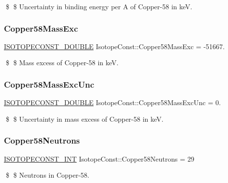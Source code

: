 \$ \$ Uncertainty in binding energy per A of Copper-\/58 in keV. \mbox{\label{group___isotope_const-_copper-_cu58_gaf9f9082962fee76e262edac355e27ec8}} 
\subsubsection{\texorpdfstring{Copper58\+Mass\+Exc}{Copper58MassExc}}
{\footnotesize\ttfamily \mbox{\hyperlink{group___isotope_const-_macros_ga8f45a7272ce02c0b4c65c44636ed719a}{I\+S\+O\+T\+O\+P\+E\+C\+O\+N\+S\+T\+\_\+\+D\+O\+U\+B\+LE}} Isotope\+Const\+::\+Copper58\+Mass\+Exc = -\/51667.}

\$ \$ Mass excess of Copper-\/58 in keV. \mbox{\label{group___isotope_const-_copper-_cu58_ga135e0f9b0f3855d0e0e2c473308fc28a}} 
\subsubsection{\texorpdfstring{Copper58\+Mass\+Exc\+Unc}{Copper58MassExcUnc}}
{\footnotesize\ttfamily \mbox{\hyperlink{group___isotope_const-_macros_ga8f45a7272ce02c0b4c65c44636ed719a}{I\+S\+O\+T\+O\+P\+E\+C\+O\+N\+S\+T\+\_\+\+D\+O\+U\+B\+LE}} Isotope\+Const\+::\+Copper58\+Mass\+Exc\+Unc = 0.}

\$ \$ Uncertainty in mass excess of Copper-\/58 in keV. \mbox{\label{group___isotope_const-_copper-_cu58_ga0bb9ef464064f0443f2b0a7e47900eda}} 
\subsubsection{\texorpdfstring{Copper58\+Neutrons}{Copper58Neutrons}}
{\footnotesize\ttfamily \mbox{\hyperlink{group___isotope_const-_macros_ga5f18360b3e99483a35c32d789e62621c}{I\+S\+O\+T\+O\+P\+E\+C\+O\+N\+S\+T\+\_\+\+I\+NT}} Isotope\+Const\+::\+Copper58\+Neutrons = 29}

\$ \$ Neutrons in Copper-\/58. \mbox{\label{group___isotope_const-_copper-_cu58_ga8323439619fb3ceef4b541c5bac2ddf9}} 
